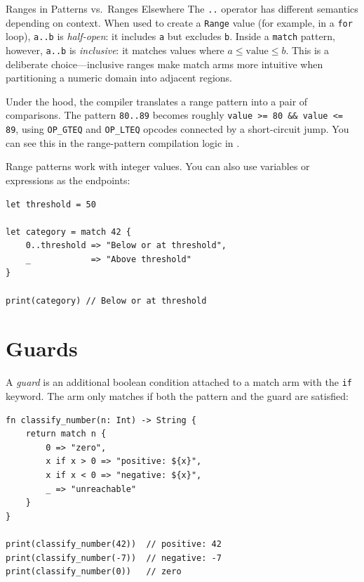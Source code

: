 \begin{warnbox}{Ranges in Patterns vs.\ Ranges Elsewhere}
The \lstinline|..| operator has different semantics depending on context. When used to create a \lstinline|Range| value (for example, in a \lstinline|for| loop), \lstinline|a..b| is \emph{half-open}: it includes \lstinline|a| but excludes \lstinline|b|. Inside a \lstinline|match| pattern, however, \lstinline|a..b| is \emph{inclusive}: it matches values where $a \le \text{value} \le b$. This is a deliberate choice---inclusive ranges make match arms more intuitive when partitioning a numeric domain into adjacent regions.
\end{warnbox}

Under the hood, the compiler translates a range pattern into a pair of comparisons. The pattern \lstinline|80..89| becomes roughly \lstinline|value >= 80 && value <= 89|, using \lstinline|OP_GTEQ| and \lstinline|OP_LTEQ| opcodes connected by a short-circuit jump. You can see this in the range-pattern compilation logic in .

Range patterns work with integer values. You can also use variables or expressions as the endpoints:

\begin{lstlisting}[language=Lattice, caption={Dynamic range endpoints}]
let threshold = 50

let category = match 42 {
    0..threshold => "Below or at threshold",
    _            => "Above threshold"
}

print(category) // Below or at threshold
\end{lstlisting}

\section{Guards}\label{sec:guards}

A \emph{guard} is an additional boolean condition attached to a match arm with the \lstinline|if| keyword. The arm only matches if both the pattern and the guard are satisfied:

\begin{lstlisting}[language=Lattice, caption={Guards refine pattern matches}]
fn classify_number(n: Int) -> String {
    return match n {
        0 => "zero",
        x if x > 0 => "positive: ${x}",
        x if x < 0 => "negative: ${x}",
        _ => "unreachable"
    }
}

print(classify_number(42))  // positive: 42
print(classify_number(-7))  // negative: -7
print(classify_number(0))   // zero
\end{lstlisting}


